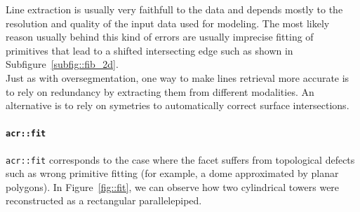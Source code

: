                 Line extraction is usually very faithfull to the data and depends mostly to the resolution and quality of the input data used for modeling.
                The most likely reason usually behind this kind of errors are usually imprecise fitting of primitives that lead to a shifted intersecting edge such as shown in Subfigure~\ref{subfig::fib_2d}.\\

                Just as with oversegmentation, one way to make lines retrieval more accurate is to rely on redundancy by extracting them from different modalities.
                An alternative is to rely on symetries \addref to automatically correct surface intersections.

            \paragraph{\texttt{\acrlong*{acr::fit}}}
                \texttt{\gls{acr::fit}} corresponds to the case where the facet suffers from topological defects such as wrong primitive fitting (for example, a dome approximated by planar polygons).
                In Figure~\ref{fig::fit}, we can observe how two cylindrical towers were reconstructed as a rectangular parallelepiped.\\

